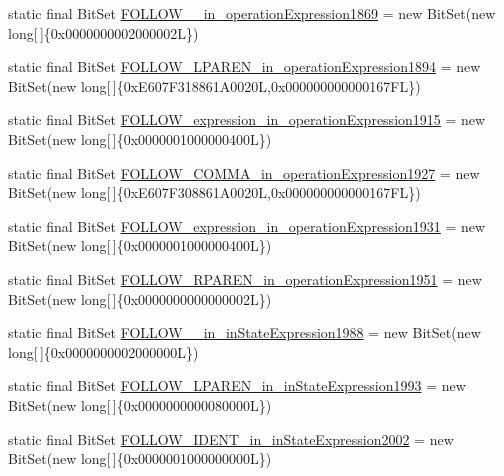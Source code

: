 \begin{DoxyCompactItemize}
static final Bit\-Set \hyperlink{classorg_1_1tzi_1_1use_1_1parser_1_1ocl_1_1_o_c_l_parser_a804b6d5cbae2159b6b27c3f5e194413d}{F\-O\-L\-L\-O\-W\-\_\-\_\-in\-\_\-operation\-Expression1869} = new Bit\-Set(new long\mbox{[}$\,$\mbox{]}\{0x0000000002000002\-L\})
\item 
static final Bit\-Set \hyperlink{classorg_1_1tzi_1_1use_1_1parser_1_1ocl_1_1_o_c_l_parser_aed4ddfe52348313b455e8a649de19509}{F\-O\-L\-L\-O\-W\-\_\-\-L\-P\-A\-R\-E\-N\-\_\-in\-\_\-operation\-Expression1894} = new Bit\-Set(new long\mbox{[}$\,$\mbox{]}\{0x\-E607\-F318861\-A0020\-L,0x000000000000167\-F\-L\})
\item 
static final Bit\-Set \hyperlink{classorg_1_1tzi_1_1use_1_1parser_1_1ocl_1_1_o_c_l_parser_ac304e1579297d1c5d86d4dab61781747}{F\-O\-L\-L\-O\-W\-\_\-expression\-\_\-in\-\_\-operation\-Expression1915} = new Bit\-Set(new long\mbox{[}$\,$\mbox{]}\{0x0000001000000400\-L\})
\item 
static final Bit\-Set \hyperlink{classorg_1_1tzi_1_1use_1_1parser_1_1ocl_1_1_o_c_l_parser_ac3848dd2c149a172eddea63a0898e6c8}{F\-O\-L\-L\-O\-W\-\_\-\-C\-O\-M\-M\-A\-\_\-in\-\_\-operation\-Expression1927} = new Bit\-Set(new long\mbox{[}$\,$\mbox{]}\{0x\-E607\-F308861\-A0020\-L,0x000000000000167\-F\-L\})
\item 
static final Bit\-Set \hyperlink{classorg_1_1tzi_1_1use_1_1parser_1_1ocl_1_1_o_c_l_parser_a15e11a6fc98a3bfb085b202b88cf5de1}{F\-O\-L\-L\-O\-W\-\_\-expression\-\_\-in\-\_\-operation\-Expression1931} = new Bit\-Set(new long\mbox{[}$\,$\mbox{]}\{0x0000001000000400\-L\})
\item 
static final Bit\-Set \hyperlink{classorg_1_1tzi_1_1use_1_1parser_1_1ocl_1_1_o_c_l_parser_a1631815498eb280a9e7909b19a843913}{F\-O\-L\-L\-O\-W\-\_\-\-R\-P\-A\-R\-E\-N\-\_\-in\-\_\-operation\-Expression1951} = new Bit\-Set(new long\mbox{[}$\,$\mbox{]}\{0x0000000000000002\-L\})
\item 
static final Bit\-Set \hyperlink{classorg_1_1tzi_1_1use_1_1parser_1_1ocl_1_1_o_c_l_parser_a29d2b2d8f93df6398551a9f5b48af0ae}{F\-O\-L\-L\-O\-W\-\_\-\_\-in\-\_\-in\-State\-Expression1988} = new Bit\-Set(new long\mbox{[}$\,$\mbox{]}\{0x0000000002000000\-L\})
\item 
static final Bit\-Set \hyperlink{classorg_1_1tzi_1_1use_1_1parser_1_1ocl_1_1_o_c_l_parser_ae4f68d0bde5898b555d3e4ee7ec66aa3}{F\-O\-L\-L\-O\-W\-\_\-\-L\-P\-A\-R\-E\-N\-\_\-in\-\_\-in\-State\-Expression1993} = new Bit\-Set(new long\mbox{[}$\,$\mbox{]}\{0x0000000000080000\-L\})
\item 
static final Bit\-Set \hyperlink{classorg_1_1tzi_1_1use_1_1parser_1_1ocl_1_1_o_c_l_parser_a4a323934fef5c4c3a8f0eb1dd513b670}{F\-O\-L\-L\-O\-W\-\_\-\-I\-D\-E\-N\-T\-\_\-in\-\_\-in\-State\-Expression2002} = new Bit\-Set(new long\mbox{[}$\,$\mbox{]}\{0x0000001000000000\-L\})

\end{DoxyCompactItemize}
